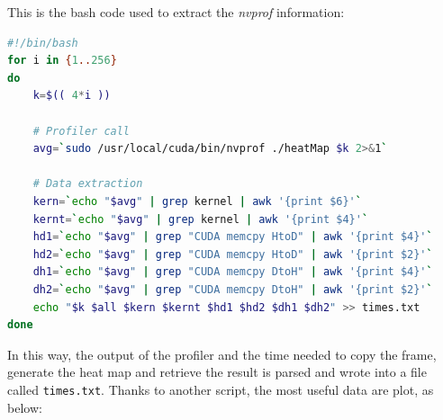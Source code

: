 \documentclass[paper=a4, fontsize=10pt]{scrartcl}	%
\begin{document}
	This is the bash code used to extract the \textit{nvprof} information:
	\begin{lstlisting}[language=bash]
#!/bin/bash
for i in {1..256}
do
	k=$(( 4*i ))
	
	# Profiler call
	avg=`sudo /usr/local/cuda/bin/nvprof ./heatMap $k 2>&1`
	
	# Data extraction
	kern=`echo "$avg" | grep kernel | awk '{print $6}'`
	kernt=`echo "$avg" | grep kernel | awk '{print $4}'`
	hd1=`echo "$avg" | grep "CUDA memcpy HtoD" | awk '{print $4}'`
	hd2=`echo "$avg" | grep "CUDA memcpy HtoD" | awk '{print $2}'`
	dh1=`echo "$avg" | grep "CUDA memcpy DtoH" | awk '{print $4}'`
	dh2=`echo "$avg" | grep "CUDA memcpy DtoH" | awk '{print $2}'`
	echo "$k $all $kern $kernt $hd1 $hd2 $dh1 $dh2" >> times.txt
done\end{lstlisting}
	In this way, the output of the profiler and the time needed to copy the frame, generate the heat map and retrieve the result is parsed and wrote into a file called \texttt{times.txt}. Thanks to another script, the most useful data are plot, as below:
	
\end{document}
